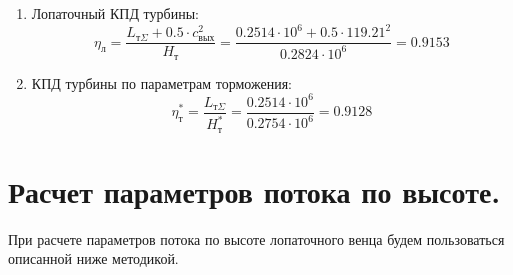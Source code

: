 \documentclass[a4paper,10pt]{article}
\begin{document}
\begin{enumerate}
        \item Лопаточный КПД турбины:
        \[
            \eta_л = \frac{
                        L_{т\Sigma} + 0.5 \cdot c_{вых}^2
                    }{ H_т } =
            \frac{
                0.2514 \cdot 10^6 + 0.5 \cdot 119.21 ^ 2
            }{ 0.2824 \cdot 10^6 } =
            0.9153
        \]

        \item КПД турбины по параметрам торможения:
        \[
            \eta_т^* = \frac{ L_{т\Sigma} }{ H_т^* } =
                \frac{ 0.2514 \cdot 10^6 }{ 0.2754 \cdot 10^6 } =
            0.9128
        \]

    \end{enumerate}
    

    \section{Расчет параметров потока по высоте.}

    

    При расчете параметров потока по высоте лопаточного венца будем пользоваться описанной ниже методикой.
\end{document}
